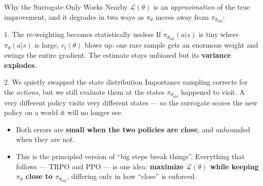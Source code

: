 \begin{frame}{Why the Surrogate Only Works Nearby}
$\mathcal{L}(\theta)$ is an \emph{approximation} of the true improvement, and it degrades in two ways as $\pi_\theta$ moves away from $\pi_{\theta_\text{old}}$:
\vspace{0.3em}
\begin{block}{1. The re-weighting becomes statistically useless}
If $\pi_{\theta_\text{old}}(a|s)$ is tiny where $\pi_\theta(a|s)$ is large, $r_t(\theta)$ blows up: one rare sample gets an enormous weight and swings the entire gradient. The estimate stays unbiased but its \textbf{variance explodes}.
\end{block}
\begin{block}{2. We quietly swapped the state distribution}
Importance sampling corrects for the \emph{actions}, but we still evaluate them at the states $\pi_{\theta_\text{old}}$ happened to visit. A very different policy visits very different states --- so the surrogate scores the new policy on a world it will no longer see.
\end{block}
\vspace{0.3em}
\begin{itemize}
    \item Both errors are \textbf{small when the two policies are close}, and unbounded when they are not.
    \item[$\Rightarrow$] This is the principled version of ``big steps break things''. Everything that follows --- TRPO and PPO --- is one idea: \textbf{maximize $\mathcal{L}(\theta)$ while keeping $\pi_\theta$ close to $\pi_{\theta_\text{old}}$}, differing only in how ``close'' is enforced.
\end{itemize}
\end{frame}

